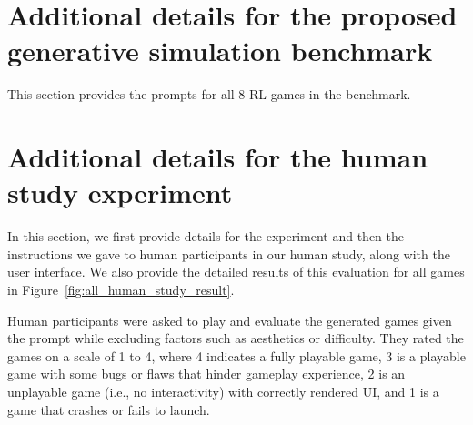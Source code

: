 \documentclass{article}
\theoremstyle{plain}
\theoremstyle{definition}
\theoremstyle{remark}
\begin{document}






\section{Additional details for the proposed generative simulation benchmark}
This section provides the prompts for all 8 RL games in the benchmark.










\section{Additional details for the human study experiment}
In this section, we first provide details for the experiment and then the instructions we gave to human participants in our human study, along with the user interface. We also provide the detailed results of this evaluation for all games in Figure~\ref{fig:all_human_study_result}.

Human participants were asked to play and evaluate the generated games given the prompt while excluding factors such as aesthetics or difficulty. They rated the games on a scale of 1 to 4, where 4 indicates a fully playable game, 3 is a playable game with some bugs or flaws that hinder gameplay experience, 2 is an unplayable game (i.e., no interactivity) with correctly rendered UI, and 1 is a game that crashes or fails to launch.
\end{document}
